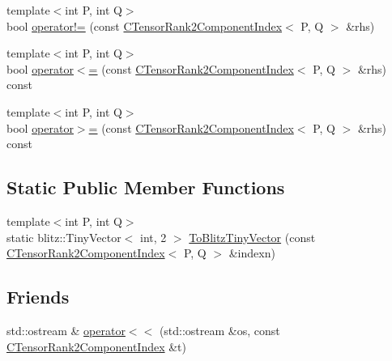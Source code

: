 \begin{DoxyCompactItemize}
\item 
{\footnotesize template$<$int P, int Q$>$ }\\bool \mbox{\hyperlink{classmpc_1_1core_1_1_c_tensor_rank2_component_index_a052391422fa03b261456a51ddbd388d8}{operator!=}} (const \mbox{\hyperlink{classmpc_1_1core_1_1_c_tensor_rank2_component_index}{C\+Tensor\+Rank2\+Component\+Index}}$<$ P, Q $>$ \&rhs)
\item 
{\footnotesize template$<$int P, int Q$>$ }\\bool \mbox{\hyperlink{classmpc_1_1core_1_1_c_tensor_rank2_component_index_ad034cd6d15be78437e9036767ecc2986}{operator$<$=}} (const \mbox{\hyperlink{classmpc_1_1core_1_1_c_tensor_rank2_component_index}{C\+Tensor\+Rank2\+Component\+Index}}$<$ P, Q $>$ \&rhs) const
\item 
{\footnotesize template$<$int P, int Q$>$ }\\bool \mbox{\hyperlink{classmpc_1_1core_1_1_c_tensor_rank2_component_index_a058e6de05a69a5dcbc6957081ec153bf}{operator$>$=}} (const \mbox{\hyperlink{classmpc_1_1core_1_1_c_tensor_rank2_component_index}{C\+Tensor\+Rank2\+Component\+Index}}$<$ P, Q $>$ \&rhs) const
\end{DoxyCompactItemize}
\subsection*{Static Public Member Functions}
\begin{DoxyCompactItemize}
\item 
{\footnotesize template$<$int P, int Q$>$ }\\static blitz\+::\+Tiny\+Vector$<$ int, 2 $>$ \mbox{\hyperlink{classmpc_1_1core_1_1_c_tensor_rank2_component_index_afc534a2e0322c3dc71904e4b02a221ea}{To\+Blitz\+Tiny\+Vector}} (const \mbox{\hyperlink{classmpc_1_1core_1_1_c_tensor_rank2_component_index}{C\+Tensor\+Rank2\+Component\+Index}}$<$ P, Q $>$ \&indexn)
\end{DoxyCompactItemize}
\subsection*{Friends}
\begin{DoxyCompactItemize}
\item 
std\+::ostream \& \mbox{\hyperlink{classmpc_1_1core_1_1_c_tensor_rank2_component_index_a13d821c3dc9b99854bc96973ac0920b2}{operator$<$$<$}} (std\+::ostream \&os, const \mbox{\hyperlink{classmpc_1_1core_1_1_c_tensor_rank2_component_index}{C\+Tensor\+Rank2\+Component\+Index}} \&t)
\end{DoxyCompactItemize}


